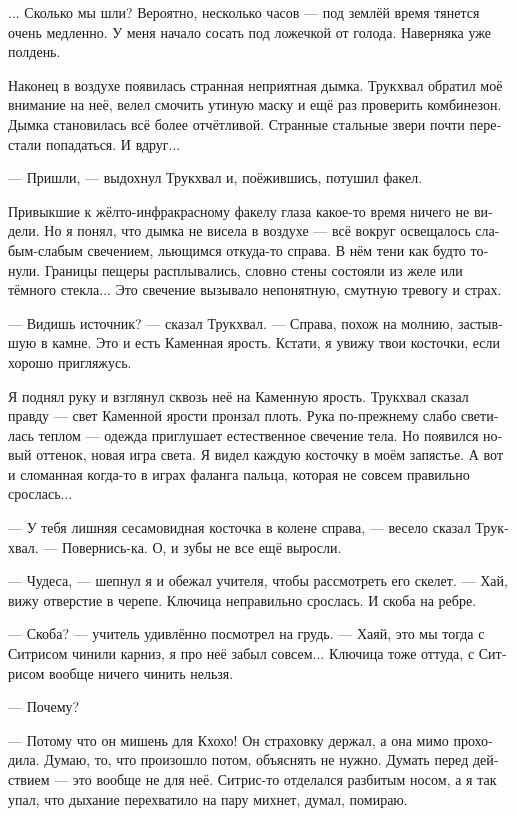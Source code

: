 \documentclass[a4paper,12pt,fleqn]{book}\usepackage{polyglossia}\setdefaultlanguage[babelshorthands=true]{russian}\setotherlanguage{english}\defaultfontfeatures{Ligatures=TeX,Mapping=tex-text}\usepackage{xcolor}\newcommand{\ml}[3]{#2}
\begin{document}
{... Сколько мы шли?
Вероятно, несколько часов --- под землёй время тянется очень медленно.
У меня начало сосать под ложечкой от голода.
Наверняка уже полдень.

Наконец в воздухе появилась странная неприятная дымка.
Трукхвал обратил моё внимание на неё, велел смочить утиную маску и ещё раз проверить комбинезон.
Дымка становилась всё более отчётливой.
Странные стальные звери почти перестали попадаться.
И вдруг...

--- Пришли, --- выдохнул Трукхвал и, поёжившись, потушил факел.

Привыкшие к жёлто-инфракрасному факелу глаза какое-то время ничего не видели.
Но я понял, что дымка не висела в воздухе --- всё вокруг освещалось слабым-слабым свечением, льющимся откуда-то справа.
В нём тени как будто тонули.
Границы пещеры расплывались, словно стены состояли из желе или тёмного стекла...
Это свечение вызывало непонятную, смутную тревогу и страх.

--- Видишь источник? --- сказал Трукхвал.
--- Справа, похож на молнию, застывшую в камне.
Это и есть Каменная ярость.
Кстати, я увижу твои косточки, если хорошо пригляжусь.

Я поднял руку и взглянул сквозь неё на Каменную ярость.
Трукхвал сказал правду --- свет Каменной ярости пронзал плоть.
Рука по-прежнему слабо светилась теплом --- одежда приглушает естественное свечение тела.
Но появился новый оттенок, новая игра света.
Я видел каждую косточку в моём запястье.
А вот и сломанная когда-то в играх фаланга пальца, которая не совсем правильно срослась...

--- У тебя лишняя сесамовидная косточка в колене справа, --- весело сказал Трукхвал.
--- Повернись-ка.
О, и зубы не все ещё выросли.

--- Чудеса, --- шепнул я и обежал учителя, чтобы рассмотреть его скелет.
--- Хай, вижу отверстие в черепе.
Ключица неправильно срослась.
И скоба на ребре.

--- Скоба? --- учитель удивлённо посмотрел на грудь.
--- Хаяй, это мы тогда с Ситрисом чинили карниз, я про неё забыл совсем...
Ключица тоже оттуда, с Ситрисом вообще ничего чинить нельзя.

--- Почему?

--- Потому что он мишень для Кхохо!
Он страховку держал, а она мимо проходила.
Думаю, то, что произошло потом, объяснять не нужно.
Думать перед действием --- это вообще не для неё.
Ситрис-то отделался разбитым носом, а я так упал, что дыхание перехватило на пару михнет, думал, помираю.

}
\end{document}
